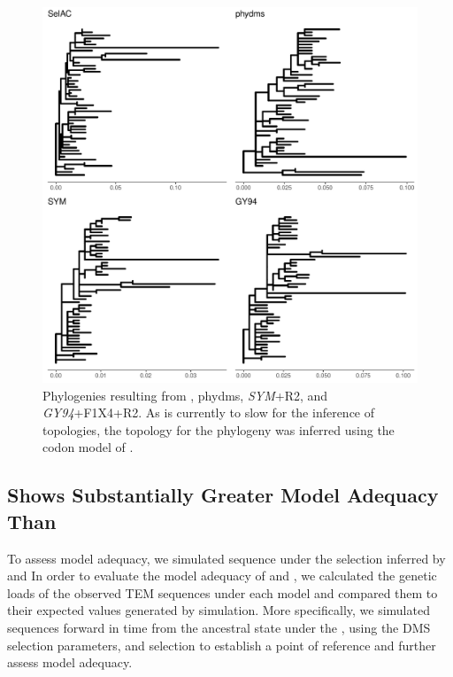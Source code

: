 \documentclass[fleqn,letterpaper]{article}
\begin{document}
\singlespacing
\begin{figure}[H]
     \centering
	\includegraphics[width=\textwidth]{img/phy_TEM2016.pdf}
	\caption{Phylogenies resulting from \selac, phydms, \emph{SYM}+R2, and \emph{GY94}+F1X4+R2. As \selac is currently to slow for the inference of topologies, the topology for the \selac phylogeny was inferred using the codon model of \citet{KosiolEtAl07}.}
	\label{fig:phylo}
\end{figure}
\doublespacing

\subsection{\selac Shows Substantially Greater Model Adequacy Than \phydms}

To assess model adequacy, we simulated sequence under the selection inferred by \phydms and \selac 
In order to evaluate the model adequacy of \selac and \phydms, we calculated the genetic loads of the observed TEM sequences under each model and compared them to their expected values generated by simulation.
More specifically, we simulated sequences forward in time from the ancestral state under the \phydms, using the DMS selection parameters, and \selac selection to establish a point of reference and further assess model adequacy.
\end{document}
